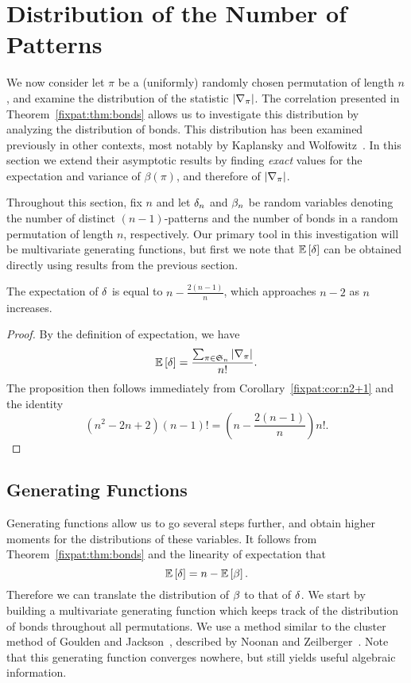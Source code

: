     
  
\section{Distribution of the Number of Patterns}
  \label{fixpat:sec:delpi}

  We now consider let $\pi$ be a (uniformly) randomly  chosen
  permutation of length $n$, and examine the distribution of the statistic
  $|\nabla_\pi|$. The correlation presented in Theorem~\ref{fixpat:thm:bonds}
  allows us to investigate this distribution by analyzing the distribution of
  bonds. This distribution has been examined previously in other contexts, most
  notably by Kaplansky and Wolfowitz~\cite{Kaplansky, Wolfowitz}. In this
  section we extend their asymptotic results by finding \emph{exact} values for
  the expectation and variance of $\beta(\pi)$, and therefore of $|\nabla_\pi|$. 

  Throughout this section, fix $n$ and let $\delta_n$ and $\beta_n$ be random
  variables denoting the number of distinct $(n-1)$-patterns and the number of
  bonds in a random permutation of length $n$, respectively.  Our primary tool
  in this investigation will be multivariate generating functions, but first we
  note that $\mathbb{E}\left[ \delta \right]$ can be obtained directly using results from the
  previous section. 

  \begin{proposition} \label{fixpat:prop:easyexpectation}
    The expectation of $\delta$ is equal to $n - \frac{2(n-1)}{n}$, which
    approaches $n-2$ as $n$ increases. 
  \end{proposition}
  \begin{proof}
    By the definition of expectation, we have 
    $$ \mathbb{E}\left[ \delta \right] = \frac{\sum_{\pi \in \mathfrak{S}_n} |\nabla_\pi| }{n!}. $$
    The proposition then follows immediately from
    Corollary~\ref{fixpat:cor:n2+1} and the identity
    $$ (n^2 - 2n + 2) (n-1)! = \left(n - \frac{2(n-1)}{n}\right) n!.$$
  \end{proof}


\subsection{Generating Functions}

  Generating functions allow us to go several steps further, and obtain
  higher moments for the distributions of these variables. It follows from
  Theorem~\ref{fixpat:thm:bonds} and the linearity of expectation
   that 
  $$ \mathbb{E}\left[ \delta \right] = n - \mathbb{E}\left[ \beta \right].$$
  Therefore we can translate the distribution of $\beta$ to that of $\delta$. 
  We start by building a multivariate generating function which keeps track
  of the distribution of bonds throughout all permutations. We use a method
  similar to the cluster method of Goulden and Jackson~\cite{gouldenjackson1,
  gouldenjackson2}, described by Noonan and Zeilberger~\cite{Noonan1999}. Note
  that this generating function converges nowhere, but still yields useful
  algebraic information. 

